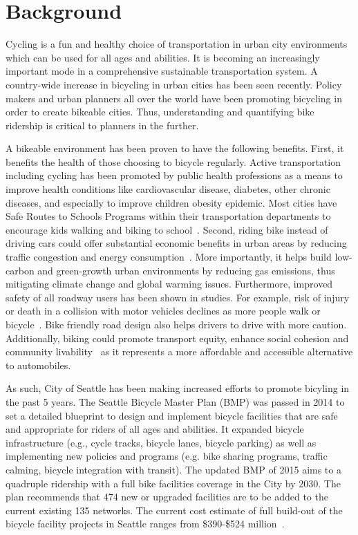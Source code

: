 \documentclass [11pt, proquest] {uwthesis}[2015/03/03]
\begin{document}
\section{Background}
Cycling is a fun and healthy choice of transportation in urban city environments which can be used for all ages and abilities. It is becoming an increasingly important mode in a comprehensive sustainable transportation system.  A country-wide increase in bicycling in urban cities has been seen recently. %
Policy makers and urban planners all over the world have been promoting bicycling in order to create bikeable cities. Thus, understanding and quantifying bike ridership is critical to planners in the further.

A bikeable environment has been proven to have the following benefits. First, it benefits the health of those choosing to bicycle regularly. Active transportation including cycling has been promoted by public health professions as a means to improve health conditions like cardiovascular disease, diabetes, other chronic diseases, and especially to improve children obesity epidemic. Most cities have Safe Routes to Schools Programs within their transportation departments to encourage kids walking and biking to school~\cite{Skerett01,Colditz97}. Second, riding bike instead of driving cars could offer substantial economic benefits in urban areas by reducing traffic congestion and energy consumption~\cite{Sener09}. More importantly, it helps build low-carbon and green-growth urban environments by reducing gas emissions, thus mitigating climate change and global warming issues. Furthermore, improved safety of all roadway users has been shown in studies. For example, risk of injury or death in a collision with motor vehicles declines as more people walk or bicycle~\cite{Turner06,Wittink03}. Bike friendly road design also helps drivers to drive with more caution. Additionally, biking could promote transport equity, enhance social cohesion and community livability~\cite{Litman07} as it represents a more affordable and accessible alternative to automobiles.

As such, City of Seattle has been making increased efforts to promote bicyling in the past 5 years. The Seattle Bicycle Master Plan (BMP) was passed in 2014 to set a detailed blueprint to design and implement bicycle facilities that are safe and appropriate for riders of all ages and abilities. It expanded bicycle infrastructure (e.g., cycle tracks, bicycle lanes, bicycle parking) as well as implementing new policies and programs (e.g. bike sharing programs, traffic calming, bicycle integration with transit). The updated BMP of 2015 aims to a quadruple ridership with a full bike facilities coverage in the City by 2030. The plan recommends that 474 new or upgraded facilities are to be added to the current existing 135 networks. The current cost estimate of full build-out of the bicycle facility projects in Seattle ranges from \$390-\$524 million~\cite{SDOT_BMP15}.
\end{document}
